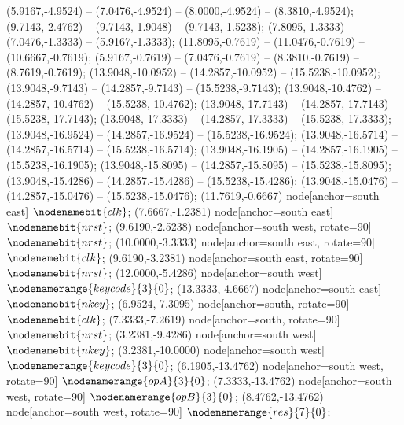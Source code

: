    (5.9167,-4.9524) -- (7.0476,-4.9524) -- (8.0000,-4.9524) -- (8.3810,-4.9524);
   (9.7143,-2.4762) -- (9.7143,-1.9048) -- (9.7143,-1.5238);
   (7.8095,-1.3333) -- (7.0476,-1.3333) -- (5.9167,-1.3333);
   (11.8095,-0.7619) -- (11.0476,-0.7619) -- (10.6667,-0.7619);
   (5.9167,-0.7619) -- (7.0476,-0.7619) -- (8.3810,-0.7619) -- (8.7619,-0.7619);
   (13.9048,-10.0952) -- (14.2857,-10.0952) -- (15.5238,-10.0952);
   (13.9048,-9.7143) -- (14.2857,-9.7143) -- (15.5238,-9.7143);
   (13.9048,-10.4762) -- (14.2857,-10.4762) -- (15.5238,-10.4762);
   (13.9048,-17.7143) -- (14.2857,-17.7143) -- (15.5238,-17.7143);
   (13.9048,-17.3333) -- (14.2857,-17.3333) -- (15.5238,-17.3333);
   (13.9048,-16.9524) -- (14.2857,-16.9524) -- (15.5238,-16.9524);
   (13.9048,-16.5714) -- (14.2857,-16.5714) -- (15.5238,-16.5714);
   (13.9048,-16.1905) -- (14.2857,-16.1905) -- (15.5238,-16.1905);
   (13.9048,-15.8095) -- (14.2857,-15.8095) -- (15.5238,-15.8095);
   (13.9048,-15.4286) -- (14.2857,-15.4286) -- (15.5238,-15.4286);
   (13.9048,-15.0476) -- (14.2857,-15.0476) -- (15.5238,-15.0476);
   (11.7619,-0.6667) node[anchor=south east] {$\nodenamebit{clk}$};
   (7.6667,-1.2381) node[anchor=south east] {$\nodenamebit{nrst}$};
   (9.6190,-2.5238) node[anchor=south west, rotate=90] {$\nodenamebit{nrst}$};
   (10.0000,-3.3333) node[anchor=south east, rotate=90] {$\nodenamebit{clk}$};
   (9.6190,-3.2381) node[anchor=south east, rotate=90] {$\nodenamebit{nrst}$};
   (12.0000,-5.4286) node[anchor=south west] {$\nodenamerange{keycode}{3}{0}$};
   (13.3333,-4.6667) node[anchor=south east] {$\nodenamebit{nkey}$};
   (6.9524,-7.3095) node[anchor=south, rotate=90] {$\nodenamebit{clk}$};
   (7.3333,-7.2619) node[anchor=south, rotate=90] {$\nodenamebit{nrst}$};
   (3.2381,-9.4286) node[anchor=south west] {$\nodenamebit{nkey}$};
   (3.2381,-10.0000) node[anchor=south west] {$\nodenamerange{keycode}{3}{0}$};
   (6.1905,-13.4762) node[anchor=south west, rotate=90] {$\nodenamerange{opA}{3}{0}$};
   (7.3333,-13.4762) node[anchor=south west, rotate=90] {$\nodenamerange{opB}{3}{0}$};
   (8.4762,-13.4762) node[anchor=south west, rotate=90] {$\nodenamerange{res}{7}{0}$};
